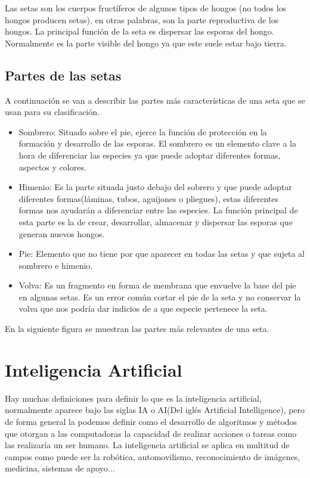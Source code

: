Las setas son los cuerpos fructíferos de algunos tipos de hongos (no todos los hongos producen setas), en otras palabras, son la parte reproductiva de los hongos. La principal función de la seta es dispersar las esporas del hongo. Normalmente es la parte visible del hongo ya que este suele estar bajo tierra.

\subsection{Partes de las setas}

A continuación se van a describir las partes más características de una seta que se usan para su clasificación.

\begin{itemize}
	\item{Sombrero}: Situado sobre el pie, ejerce la función de protección en la formación y desarrollo de las esporas. El sombrero es un elemento clave a la hora de diferenciar las especies ya que puede adoptar diferentes formas, aspectos y colores.
	\item{Himenio}: Es la parte situada justo debajo del sobrero y que puede adoptar diferentes formas(láminas, tubos, aguijones o pliegues), estas diferentes formas nos ayudarán a diferenciar entre las especies. La función principal de esta parte es la de crear, desarrollar, almacenar y dispersar las esporas que generan nuevos hongos.
	\item{Pie}: Elemento que no tiene por que aparecer en todas las setas y que sujeta al sombrero e himenio.
	\item{Volva}: Es un fragmento en forma de membrana que envuelve la base del pie en algunas setas. Es un error común cortar el pie de la seta y no conservar la volva que nos podría dar indicios de a que especie pertenece la seta.~\cite{partesSeta}
\end{itemize}

En la siguiente figura se muestran las partes más relevantes de una seta.

\section{Inteligencia Artificial}
Hay muchas definiciones para definir lo que es la inteligencia artificial, normalmente aparece bajo las siglas IA o AI(Del iglés Artificial Intelligence), pero de forma general la podemos definir como el desarrollo de algoritmos y métodos que otorgan a las computadoras la capacidad de realizar acciones o tareas como las realizaría un ser humano. La inteligencia artificial se aplica en multitud de campos como puede ser la robótica, automovilismo, reconocimiento de imágenes, medicina, sistemas de apoyo...

